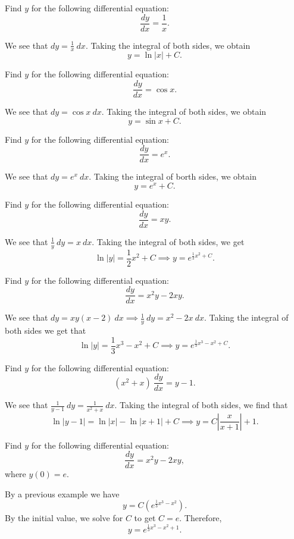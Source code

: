 \begin{example}
    Find $y$ for the following differential equation:
    $$\frac{dy}{dx} = \frac{1}{x}.$$
\end{example}
\begin{soln}
    We see that $dy = \frac{1}{x} ~ dx$. Taking the integral of both sides,
    we obtain $$y = \ln|x| + C.$$
\end{soln}
\begin{example}
    Find $y$ for the following differential equation:
    $$\frac{dy}{dx} = \cos x.$$
\end{example}
\begin{soln}
    We see that $dy = \cos x ~ dx$. Taking the integral of both sides, we obtain
    $$\boxed{y = \sin x + C}.$$
\end{soln}
\begin{example}
    Find $y$ for the following differential equation:
    $$\frac{dy}{dx} = e^x.$$
\end{example}
\begin{soln}
    We see that $dy = e^x ~ dx$. Taking the integral of borth sides, we obtain
    $$\boxed{y =  e^x + C}.$$
\end{soln}
\begin{example}
    Find $y$ for the following differential equation: 
    $$\frac{dy}{dx} = xy.$$
\end{example}
\begin{soln}
    We see that $\frac{1}{y} ~ dy  = x ~ dx$. Taking the integral of
    both sides, we get
    $$\ln |y| = \frac{1}{2}x^2 + C \implies y = e^{\frac{1}{2}x^2+C}.$$
\end{soln}
\begin{example}
    Find $y$ for the following differential equation:
    $$\frac{dy}{dx} = x^2y-2xy.$$
\end{example}
\begin{soln}
    We see that $dy = xy(x-2) ~ dx \implies \frac{1}{y} ~dy= x^2-2x ~ dx$.
    Taking the integral of both sides we get that
    $$\ln |y| = \frac{1}{3}x^3-x^2 + C \implies y = e^{\frac{1}{3}x^3-x^2 + C}.$$
\end{soln}
\begin{example}
    Find $y$ for the following differential equation:
    $$(x^2+x)~\frac{dy}{dx} = y-1.$$
\end{example}
\begin{soln}
    We see that $\frac{1}{y-1} ~ dy = \frac{1}{x^2+x} ~ dx$. Taking the
    integral of both sides, we find that
    $$\ln|y-1| = \ln|x|-\ln|x+1| +C\implies y = C\left|\frac{x}{x+1}\right|+1.$$
\end{soln}
\begin{example}
    Find $y$ for the following differential equation:
    $$\frac{dy}{dx} = x^2y-2xy,$$
    where $y(0) = e$.
\end{example}
\begin{soln}
    By a previous example we have $$y = C\left(e^{\frac{1}{3}x^3-x^2}\right).$$
    By the initial value, we solve for $C$ to get $C = e$. Therefore,
    $$\boxed{y = e^{\frac{1}{3}x^3-x^2+1}}.$$
\end{soln}


